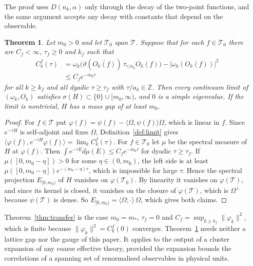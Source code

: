 \documentclass[11pt]{amsart}
\newtheorem{theorem}{Theorem}[section]
\theoremstyle{definition}
\theoremstyle{remark}
\numberwithin{equation}{section}
\newcommand{\Z}{\mathbb{Z}}
\newcommand{\ip}[2]{\langle #1,#2\rangle}
\begin{document}
The proof uses $D(n_k,\alpha)$ only through the decay of the two-point
functions, and the same argument accepts any decay with constants that
depend on the observable.

\begin{theorem}\label{thm:clustering}
Let $m_0>0$ and let $\mathcal T_0$ span $\mathcal T$. Suppose that for each
$f\in\mathcal T_0$ there are $C_f<\infty$, $\tau_f\ge0$ and $k_f$ such that
\begin{align*}
C^f_k(\tau)&=\omega_k\bigl(\vartheta(\overline{O_k(f)})\,\tau_{\tau/a_k}
O_k(f)\bigr)-|\omega_k(O_k(f))|^2\\
&\le C_fe^{-m_0\tau}
\end{align*}
for all $k\ge k_f$ and all dyadic $\tau\ge\tau_f$ with $\tau/a_k\in\Z$.
Then every continuum limit of $(\omega_k,O_k)$ satisfies $\sigma(H)\subset
\{0\}\cup[m_0,\infty)$, and $0$ is a simple eigenvalue. If the limit is
nontrivial, $H$ has a mass gap of at least $m_0$.
\end{theorem}

\begin{proof}
For $f\in\mathcal T$ put $\varphi(f)=\psi(f)-\ip\Omega{\psi(f)}\Omega$,
which is linear in $f$. Since $e^{-\tau H}$ is self-adjoint and fixes
$\Omega$, Definition~\ref{def:limit} gives $\ip{\varphi(f)}{e^{-\tau H}
\varphi(f)}=\lim_kC^f_k(\tau)$. For $f\in\mathcal T_0$ let $\mu$ be the
spectral measure of $H$ at $\varphi(f)$. Then $\int e^{-\tau E}d\mu(E)\le
C_fe^{-m_0\tau}$ for dyadic $\tau\ge\tau_f$. If $\mu([0,m_0-\eta])>0$ for
some $\eta\in(0,m_0)$, the left side is at least $\mu([0,m_0-\eta])e^{-(m_0-
\eta)\tau}$, which is impossible for large $\tau$. Hence the spectral
projection $E_{[0,m_0)}$ of $H$ vanishes on $\varphi(\mathcal T_0)$. By
linearity it vanishes on $\varphi(\mathcal T)$, and since its kernel is
closed, it vanishes on the closure of $\varphi(\mathcal T)$, which is
$\Omega^\perp$ because $\psi(\mathcal T)$ is dense. So $E_{[0,m_0)}=
\ip\Omega\cdot\,\Omega$, which gives both claims.
\end{proof}

Theorem~\ref{thm:transfer} is the case $m_0=m_*$, $\tau_f=0$ and $C_f=
\sup_{k\ge k_f}\|\varphi_k\|^2$, which is finite because $\|\varphi_k\|^2=
C^f_k(0)$ converges. Theorem~\ref{thm:clustering} needs neither a lattice
gap nor the gauge of this paper. It applies to the output of a cluster
expansion of any coarse effective theory, provided the expansion bounds
the correlations of a spanning set of renormalised observables in
physical units.
\end{document}
